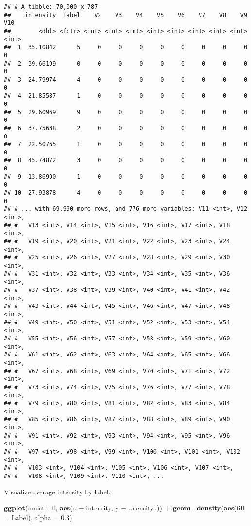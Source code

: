 \documentclass[]{book}
\newenvironment{Shaded}{\begin{snugshade}}{\end{snugshade}}
\newcommand{\KeywordTok}[1]{\textcolor[rgb]{0.13,0.29,0.53}{\textbf{#1}}}
\newcommand{\DataTypeTok}[1]{\textcolor[rgb]{0.13,0.29,0.53}{#1}}
\newcommand{\FloatTok}[1]{\textcolor[rgb]{0.00,0.00,0.81}{#1}}
\newcommand{\StringTok}[1]{\textcolor[rgb]{0.31,0.60,0.02}{#1}}
\newcommand{\OperatorTok}[1]{\textcolor[rgb]{0.81,0.36,0.00}{\textbf{#1}}}
\newcommand{\NormalTok}[1]{#1}
\theoremstyle{definition}
\theoremstyle{definition}
\theoremstyle{definition}
\theoremstyle{remark}
\begin{document}
\begin{verbatim}
## # A tibble: 70,000 x 787
##    intensity  Label    V2    V3    V4    V5    V6    V7    V8    V9   V10
##        <dbl> <fctr> <int> <int> <int> <int> <int> <int> <int> <int> <int>
##  1  35.10842      5     0     0     0     0     0     0     0     0     0
##  2  39.66199      0     0     0     0     0     0     0     0     0     0
##  3  24.79974      4     0     0     0     0     0     0     0     0     0
##  4  21.85587      1     0     0     0     0     0     0     0     0     0
##  5  29.60969      9     0     0     0     0     0     0     0     0     0
##  6  37.75638      2     0     0     0     0     0     0     0     0     0
##  7  22.50765      1     0     0     0     0     0     0     0     0     0
##  8  45.74872      3     0     0     0     0     0     0     0     0     0
##  9  13.86990      1     0     0     0     0     0     0     0     0     0
## 10  27.93878      4     0     0     0     0     0     0     0     0     0
## # ... with 69,990 more rows, and 776 more variables: V11 <int>, V12 <int>,
## #   V13 <int>, V14 <int>, V15 <int>, V16 <int>, V17 <int>, V18 <int>,
## #   V19 <int>, V20 <int>, V21 <int>, V22 <int>, V23 <int>, V24 <int>,
## #   V25 <int>, V26 <int>, V27 <int>, V28 <int>, V29 <int>, V30 <int>,
## #   V31 <int>, V32 <int>, V33 <int>, V34 <int>, V35 <int>, V36 <int>,
## #   V37 <int>, V38 <int>, V39 <int>, V40 <int>, V41 <int>, V42 <int>,
## #   V43 <int>, V44 <int>, V45 <int>, V46 <int>, V47 <int>, V48 <int>,
## #   V49 <int>, V50 <int>, V51 <int>, V52 <int>, V53 <int>, V54 <int>,
## #   V55 <int>, V56 <int>, V57 <int>, V58 <int>, V59 <int>, V60 <int>,
## #   V61 <int>, V62 <int>, V63 <int>, V64 <int>, V65 <int>, V66 <int>,
## #   V67 <int>, V68 <int>, V69 <int>, V70 <int>, V71 <int>, V72 <int>,
## #   V73 <int>, V74 <int>, V75 <int>, V76 <int>, V77 <int>, V78 <int>,
## #   V79 <int>, V80 <int>, V81 <int>, V82 <int>, V83 <int>, V84 <int>,
## #   V85 <int>, V86 <int>, V87 <int>, V88 <int>, V89 <int>, V90 <int>,
## #   V91 <int>, V92 <int>, V93 <int>, V94 <int>, V95 <int>, V96 <int>,
## #   V97 <int>, V98 <int>, V99 <int>, V100 <int>, V101 <int>, V102 <int>,
## #   V103 <int>, V104 <int>, V105 <int>, V106 <int>, V107 <int>,
## #   V108 <int>, V109 <int>, V110 <int>, ...
\end{verbatim}

Visualize average intensity by label:

\begin{Shaded}
\begin{Highlighting}[]
\KeywordTok{ggplot}\NormalTok{(mnist_df, }\KeywordTok{aes}\NormalTok{(}\DataTypeTok{x =}\NormalTok{ intensity, }\DataTypeTok{y =}\NormalTok{ ..density..)) }\OperatorTok{+}
\StringTok{  }\KeywordTok{geom_density}\NormalTok{(}\KeywordTok{aes}\NormalTok{(}\DataTypeTok{fill =}\NormalTok{ Label), }\DataTypeTok{alpha =} \FloatTok{0.3}\NormalTok{)}
\end{Highlighting}
\end{Shaded}
\end{document}
